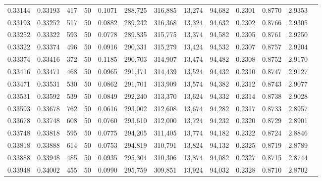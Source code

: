 \begin{tabular}{rrrrrrrrrrrrr}
0.33144 & 0.33193 &   417 &  50 &                                     0.1071 & 288,725 & 316,885 &  13,274 &  94,682 & 0.2301 & 0.8770 & 2.9353 \\
0.33193 & 0.33252 &   517 &  50 &                                     0.0882 & 289,242 & 316,368 &  13,324 &  94,632 & 0.2302 & 0.8766 & 2.9305 \\
0.33252 & 0.33322 &   593 &  50 &                                     0.0778 & 289,835 & 315,775 &  13,374 &  94,582 & 0.2305 & 0.8761 & 2.9250 \\
0.33322 & 0.33374 &   496 &  50 &                                     0.0916 & 290,331 & 315,279 &  13,424 &  94,532 & 0.2307 & 0.8757 & 2.9204 \\
0.33374 & 0.33416 &   372 &  50 &                                     0.1185 & 290,703 & 314,907 &  13,474 &  94,482 & 0.2308 & 0.8752 & 2.9170 \\
0.33416 & 0.33471 &   468 &  50 &                                     0.0965 & 291,171 & 314,439 &  13,524 &  94,432 & 0.2310 & 0.8747 & 2.9127 \\
0.33471 & 0.33531 &   530 &  50 &                                     0.0862 & 291,701 & 313,909 &  13,574 &  94,382 & 0.2312 & 0.8743 & 2.9077 \\
0.33531 & 0.33592 &   539 &  50 &                                     0.0849 & 292,240 & 313,370 &  13,624 &  94,332 & 0.2314 & 0.8738 & 2.9028 \\
0.33593 & 0.33678 &   762 &  50 &                                     0.0616 & 293,002 & 312,608 &  13,674 &  94,282 & 0.2317 & 0.8733 & 2.8957 \\
0.33678 & 0.33748 &   608 &  50 &                                     0.0760 & 293,610 & 312,000 &  13,724 &  94,232 & 0.2320 & 0.8729 & 2.8901 \\
0.33748 & 0.33818 &   595 &  50 &                                     0.0775 & 294,205 & 311,405 &  13,774 &  94,182 & 0.2322 & 0.8724 & 2.8846 \\
0.33818 & 0.33888 &   614 &  50 &                                     0.0753 & 294,819 & 310,791 &  13,824 &  94,132 & 0.2325 & 0.8719 & 2.8789 \\
0.33888 & 0.33948 &   485 &  50 &                                     0.0935 & 295,304 & 310,306 &  13,874 &  94,082 & 0.2327 & 0.8715 & 2.8744 \\
0.33948 & 0.34002 &   455 &  50 &                                     0.0990 & 295,759 & 309,851 &  13,924 &  94,032 & 0.2328 & 0.8710 & 2.8702 \\

\end{tabular}
